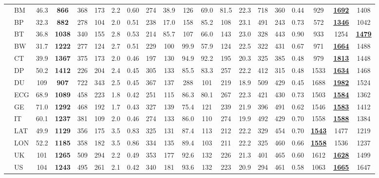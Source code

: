 \begin{table}[t]
{\begin{tabular}{@{}c l | *{10}{c} | *{8}{c} @{}}
 & BM & 46.3 & \textbf{866} & 368 & 173 & 2.2 & 0.60 & 274 & 38.9 & 126 & 69.0 & 81.5 & 22.3 & 718 & 360 & 0.44 & 929 & \underline{\textbf{1692}} & 1408 \\
 & BP & 32.3 & \textbf{882} & 278 & 104 & 2.0 & 0.51 & 238 & 17.0 & 158 & 85.2 & 108 & 23.1 & 491 & 243 & 0.73 & 572 & \underline{\textbf{1346}} & 1042 \\
 & BT & 36.8 & \textbf{1038} & 340 & 155 & 2.8 & 0.53 & 214 & 85.7 & 107 & 66.0 & 143 & 23.0 & 328 & 443 & 0.90 & 933 & 1254 & \underline{\textbf{1479}} \\
 & BW & 31.7 & \textbf{1222} & 277 & 124 & 2.7 & 0.51 & 229 & 100 & 99.9 & 57.9 & 124 & 22.5 & 322 & 431 & 0.67 & 971 & \underline{\textbf{1664}} & 1488 \\
 & CT & 39.9 & \textbf{1367} & 375 & 173 & 2.0 & 0.46 & 197 & 130 & 94.9 & 92.2 & 195 & 20.3 & 325 & 385 & 0.48 & 979 & \underline{\textbf{1813}} & 1448 \\
 & DP & 50.2 & \textbf{1412} & 226 & 204 & 2.4 & 0.45 & 305 & 133 & 85.5 & 83.3 & 257 & 22.2 & 412 & 315 & 0.48 & 1533 & \underline{\textbf{1634}} & 1468 \\
 & DU & 109 & \textbf{907} & 722 & 343 & 2.5 & 0.45 & 367 & 137 & 288 & 101 & 219 & 18.9 & 509 & 429 & 0.45 & 1688 & \underline{\textbf{1982}} & 1524 \\
 & ECG & 68.9 & \textbf{1089} & 458 & 223 & 1.8 & 0.42 & 251 & 115 & 86.3 & 80.1 & 267 & 22.3 & 421 & 430 & 0.73 & 1503 & \underline{\textbf{1584}} & 1362 \\
 & GE & 71.0 & \textbf{1292} & 468 & 192 & 1.7 & 0.43 & 327 & 139 & 75.4 & 121 & 239 & 21.9 & 396 & 491 & 0.62 & 1546 & \underline{\textbf{1583}} & 1412 \\
 & IT & 60.1 & \textbf{1237} & 381 & 109 & 2.0 & 0.46 & 274 & 133 & 86.0 & 110 & 274 & 19.9 & 492 & 429 & 0.70 & 1558 & \underline{\textbf{1588}} & 1384 \\
 & LAT & 49.9 & \textbf{1129} & 356 & 175 & 3.5 & 0.83 & 325 & 131 & 87.4 & 113 & 212 & 22.2 & 329 & 454 & 0.70 & \underline{\textbf{1543}} & 1477 & 1219 \\
 & LON & 52.2 & \textbf{1185} & 358 & 182 & 3.5 & 0.86 & 334 & 135 & 89.4 & 103 & 211 & 22.2 & 325 & 460 & 0.66 & \underline{\textbf{1558}} & 1536 & 1237 \\
 & UK & 101 & \textbf{1265} & 509 & 294 & 2.2 & 0.49 & 353 & 177 & 92.6 & 132 & 226 & 21.3 & 401 & 465 & 0.60 & 1612 & \underline{\textbf{1628}} & 1499 \\
 & US & 104 & \textbf{1243} & 495 & 261 & 2.1 & 0.42 & 340 & 181 & 93.6 & 132 & 223 & 20.9 & 294 & 461 & 0.58 & 1063 & \underline{\textbf{1665}} & 1647 \\

\end{tabular}}
\end{table}
